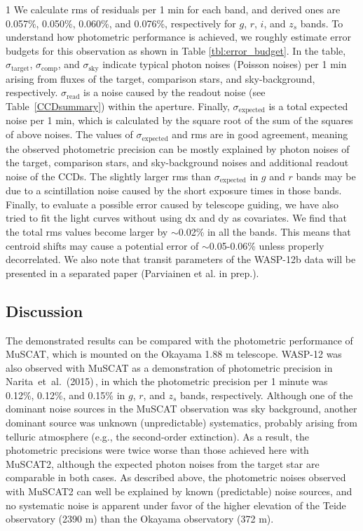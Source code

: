 \documentclass[a4paper,12pt]{spieman}  %
\begin{document}
\begin{spacing}{1}
We calculate rms of residuals per 1 min for each band, and derived ones are
0.057\%, 0.050\%, 0.060\%, and 0.076\%, respectively for $g$, $r$, $i$, and $z_s$ bands.
To understand how photometric performance is achieved, 
we roughly estimate error budgets for this observation as shown in Table \ref{tbl:error_budget}.
In the table, $\sigma_\mathrm{target}$, $\sigma_\mathrm{comp}$, and $\sigma_\mathrm{sky}$
indicate typical photon noises (Poisson noises) per 1 min arising from fluxes of
the target, comparison stars, and sky-background, respectively.
$\sigma_\mathrm{read}$ is a noise caused by the readout noise (see Table~\ref{CCDsummary})
within the aperture.
Finally, $\sigma_\mathrm{expected}$ is a total expected noise per 1 min, which is calculated by
the square root of the sum of the squares of above noises.
The values of $\sigma_\mathrm{expected}$ and rms are in good agreement, meaning
the observed photometric precision can be mostly explained by photon noises of
the target, comparison stars, and sky-background noises and additional readout noise of the CCDs.
The slightly larger rms than $\sigma_\mathrm{expected}$ in $g$ and $r$ bands may be
due to a scintillation noise caused by the short exposure times in those bands.
Finally, to evaluate a possible error caused by telescope guiding, we have also tried to fit the light curves
without using dx and dy as covariates. We find that the total rms values become larger by $\sim$0.02\%
in all the bands. This means that centroid shifts may cause a potential error of $\sim$0.05-0.06\%
unless properly decorrelated.
We also note that transit parameters of the WASP-12b data will be presented
in a separated paper (Parviainen et al. in prep.).

\subsection{Discussion}
\label{subsec:discussion}

The demonstrated results can be compared with the photometric performance of MuSCAT,
which is mounted on the Okayama 1.88 m telescope.
WASP-12 was also observed with MuSCAT as a demonstration of photometric precision in
Narita~et~al.~(2015)\cite{2015JATIS...1d5001N}\,\!,
in which the photometric precision per 1 minute was 0.12\%, 0.12\%, and 0.15\%
in $g$, $r$, and $z_s$ bands, respectively.
Although one of the dominant noise sources in the MuSCAT observation was sky background,
another dominant source was unknown (unpredictable) systematics,
probably arising from telluric atmosphere (e.g., the second-order extinction\cite{2016ApJ...819...27F}).
As a result, the photometric precisions were twice worse than those achieved here with MuSCAT2,
although the expected photon noises from the target star are comparable in both cases.
As described above, the photometric noises observed with MuSCAT2 can well be explained
by known (predictable) noise sources, and no systematic noise is apparent
under favor of the higher elevation of the Teide observatory (2390 m) than the Okayama observatory (372 m).


\end{spacing}
\end{document}
